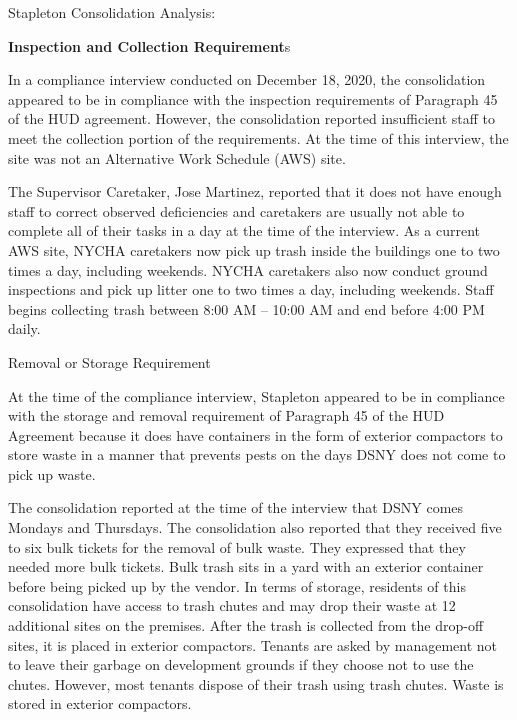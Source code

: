 Stapleton Consolidation Analysis: 



\textbf{Inspection and Collection Requirement}s 



In a compliance interview conducted on December 18, 2020, the consolidation appeared to be in compliance with the inspection requirements of Paragraph 45 of the HUD agreement. However, the consolidation reported insufficient staff to meet the collection portion of the requirements. At the time of this interview, the site was not an Alternative Work Schedule (AWS) site. 



The Supervisor Caretaker, Jose Martinez, reported that it does not have enough staff to correct observed deficiencies and caretakers are  usually not able to complete all of their tasks in a day at the time of the interview. As a current AWS site, NYCHA caretakers now pick up trash inside the buildings one to two times a day, including weekends.  NYCHA caretakers also now conduct ground inspections and pick up litter one to two times a day, including weekends. Staff begins collecting trash between 8:00 AM -- 10:00 AM and end before 4:00 PM daily. 

 

Removal or Storage Requirement 

 

At the time of the compliance interview, Stapleton appeared to be in compliance with the storage and removal requirement of Paragraph 45 of the HUD Agreement because it does have containers in the form of exterior compactors to store waste in a manner that prevents pests on the days DSNY does not come to pick up waste. 

  

The consolidation reported at the time of the interview that DSNY comes Mondays and Thursdays. The consolidation also reported that they received five to six bulk tickets for the removal of bulk waste. They expressed that they needed more bulk tickets. Bulk trash sits in a yard with an exterior container before being picked up by the vendor.  In terms of storage, residents of this consolidation have access to trash chutes and may drop their waste at 12 additional sites on the premises. After the trash is collected from the drop-off sites, it is placed in exterior compactors. Tenants are asked by management not to leave their garbage on development grounds if they choose not to use the chutes. However, most tenants dispose of their trash using trash chutes. Waste is stored in exterior compactors.

